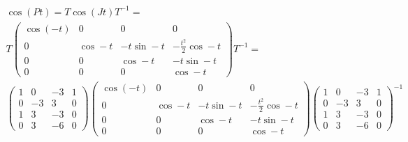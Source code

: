 \documentclass[12pt, a4paper]{article}
\begin{document}
    \begin{multline}
        \cos(Pt) = T \cos(Jt) T^{-1} =  \\
        T \left(\begin{matrix}
            \cos (-t) & 0 & 0 & 0 \\
            0 & \cos -t & -t \sin -t & -\frac{t^2}{2} \cos -t \\
            0 & 0 & \cos -t & -t \sin -t \\
            0 & 0 & 0 & \cos -t
        \end{matrix}\right) T^{-1} = \\
        \left(\begin{matrix}
            1 & 0 & -3 & 1 \\
            0 & -3 & 3 & 0 \\
            1 & 3 & -3 & 0 \\
            0 & 3 & -6 & 0
        \end{matrix}\right) \left(\begin{matrix}
            \cos (-t) & 0 & 0 & 0 \\
            0 & \cos -t & -t \sin -t & -\frac{t^2}{2} \cos -t \\
            0 & 0 & \cos -t & -t \sin -t \\
            0 & 0 & 0 & \cos -t
        \end{matrix}\right) \left(\begin{matrix}
            1 & 0 & -3 & 1 \\
            0 & -3 & 3 & 0 \\
            1 & 3 & -3 & 0 \\
            0 & 3 & -6 & 0
        \end{matrix}\right)^{-1}
    \end{multline}
\end{document}
